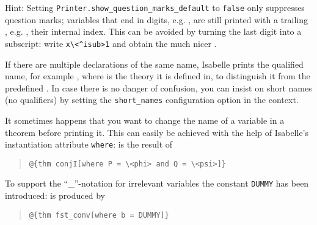 \begin{isabellebody}
\begin{isamarkuptext}
Hint: Setting \verb|Printer.show_question_marks_default| to \texttt{false} only
suppresses question marks; variables that end in digits,
e.g. , are still printed with a trailing ,
e.g. , their internal index. This can be avoided by
turning the last digit into a subscript: write \verb!x\<^isub>1! and
obtain the much nicer .%
\end{isamarkuptext}%
\isamarkuptrue%
%
\isamarkuptrue%
%
\begin{isamarkuptext}%
If there are multiple declarations of the same name, Isabelle prints
the qualified name, for example , where  is the
theory it is defined in, to distinguish it from the predefined . In case there is no danger of confusion, you can insist on
short names (no qualifiers) by setting the \verb!short_names!
configuration option in the context.%
\end{isamarkuptext}%
\isamarkuptrue%
%
\isamarkuptrue%
%
\begin{isamarkuptext}%
It sometimes happens that you want to change the name of a
variable in a theorem before printing it. This can easily be achieved
with the help of Isabelle's instantiation attribute \texttt{where}:
 is the result of
\begin{quote}
\verb!@!\verb!{thm conjI[where P = \<phi> and Q = \<psi>]}!
\end{quote}
To support the ``\_''-notation for irrelevant variables
the constant \texttt{DUMMY} has been introduced:
 is produced by
\begin{quote}
\verb!@!\verb!{thm fst_conv[where b = DUMMY]}!

\end{quote}
\end{isamarkuptext}
\end{isabellebody}
